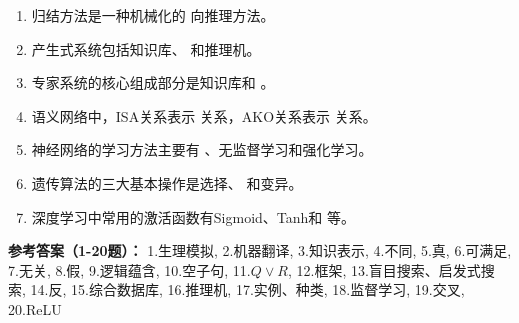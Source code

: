 \begin{enumerate}[leftmargin=2em,itemsep=1pt]
\item 归结方法是一种机械化的 \underline{\hspace{3em}} 向推理方法。
\item 产生式系统包括知识库、\underline{\hspace{3em}} 和推理机。
\item 专家系统的核心组成部分是知识库和 \underline{\hspace{3em}}。
\item 语义网络中，ISA关系表示 \underline{\hspace{3em}} 关系，AKO关系表示 \underline{\hspace{3em}} 关系。
\item 神经网络的学习方法主要有 \underline{\hspace{3em}}、无监督学习和强化学习。
\item 遗传算法的三大基本操作是选择、\underline{\hspace{3em}} 和变异。
\item 深度学习中常用的激活函数有Sigmoid、Tanh和 \underline{\hspace{3em}} 等。
\end{enumerate}

\textbf{参考答案（1-20题）：}
1.生理模拟, 2.机器翻译, 3.知识表示, 4.不同, 5.真, 6.可满足, 7.无关, 8.假, 9.逻辑蕴含, 10.空子句, 
11.$Q \lor R$, 12.框架, 13.盲目搜索、启发式搜索, 14.反, 15.综合数据库, 16.推理机, 17.实例、种类, 18.监督学习, 19.交叉, 20.ReLU

